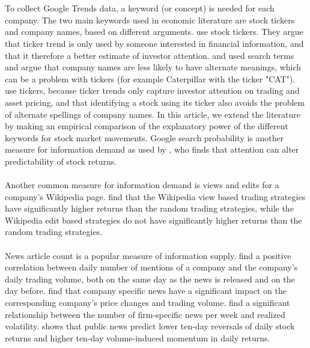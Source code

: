 \\\\
To collect Google Trends data, a keyword (or concept) is needed for each company. The two main keywords used in economic literature are stock tickers and company names, based on different arguments. \cite{joseph} use stock tickers. They argue that ticker trend is only used by someone interested in financial information, and that it therefore a better estimate of investor attention. \cite{bijl} and \cite{vlastakis} used search terms and argue that company names are less likely to have alternate meanings, which can be a problem with tickers (for example Caterpillar with the ticker "CAT"). \cite{engelberg} use tickers, because ticker trends only capture investor attention on trading and asset pricing, and that identifying a stock using its ticker also avoids the problem of alternate spellings of company names. In this article, we extend the literature by making an empirical comparison of the explanatory power of the different keywords for stock market movements. Google search probability is another measure for information demand as used by  \cite{vozlyublennaia}, who finds that attention can alter predictability of stock returns.       
\\\\
Another common measure for information demand is views and edits for a company's Wikipedia page. \cite{moat} find that the Wikipedia view based trading strategies have significantly higher returns than the random trading strategies, while the Wikipedia edit based strategies do not have significantly higher returns than the random trading strategies. 
\\\\
News article count is a popular measure of information supply. \cite{preis2013} find a positive correlation between daily number of mentions of a company and the company's daily trading volume, both on the same day as the news is released and on the day before. \cite{ryan} find that company specific news have a significant impact on the corresponding company's price changes and trading volume. \cite{vlastakis} find a significant relationship between the number of firm-specific news per week and realized volatility. \cite{tetlock} shows that public news predict lower ten-day reversals of daily stock returns and higher ten-day volume-induced momentum in daily returns.  
\\\\
